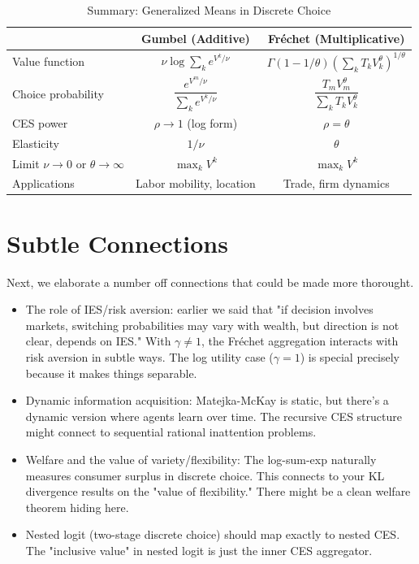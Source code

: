 \begin{table}[H]
\centering
\caption{Summary: Generalized Means in Discrete Choice}
\label{tab:discrete-summary}
\begin{tabular}{@{}lcc@{}}
\toprule
& \textbf{Gumbel (Additive)} & \textbf{Fréchet (Multiplicative)} \\
\midrule
Value function & $\nu \log \sum_k e^{V^k/\nu}$ & $\Gamma(1-1/\theta) \left( \sum_k T_k V_k^\theta \right)^{1/\theta}$ \\[6pt]
Choice probability & $\dfrac{e^{V^m/\nu}}{\sum_k e^{V^k/\nu}}$ & $\dfrac{T_m V_m^\theta}{\sum_k T_k V_k^\theta}$ \\[10pt]
CES power & $\rho \to 1$ (log form) & $\rho = \theta$ \\[4pt]
Elasticity & $1/\nu$ & $\theta$ \\[4pt]
Limit $\nu \to 0$ or $\theta \to \infty$ & $\max_k V^k$ & $\max_k V^k$ \\[4pt]
Applications & Labor mobility, location & Trade, firm dynamics \\
\bottomrule
\end{tabular}
\end{table}

\section{Subtle Connections}

Next, we elaborate a number off connections that could be made more thorought. 
\begin{itemize}
\item The role of IES/risk aversion: earlier we said that "if decision involves markets, switching probabilities may vary with wealth, but direction is not clear, depends on IES." With $\gamma\not=1$, the Fréchet aggregation interacts with risk aversion in subtle ways. The log utility case ($\gamma=1$) is special precisely because it makes things separable.

\item Dynamic information acquisition: Matejka-McKay is static, but there's a dynamic version where agents learn over time. The recursive CES structure might connect to sequential rational inattention problems.

\item Welfare and the value of variety/flexibility: The log-sum-exp naturally measures consumer surplus in discrete choice. This connects to your KL divergence results on the "value of flexibility." There might be a clean welfare theorem hiding here.

\item Nested logit (two-stage discrete choice) should map exactly to nested CES. The "inclusive value" in nested logit is just the inner CES aggregator.
\end{itemize}


